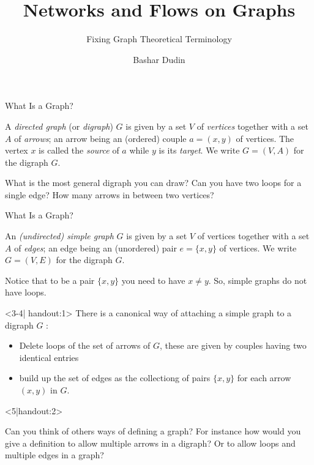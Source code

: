 \documentclass[32pt,aspectratio=169]{beamer}
\author[BD]{Bashar Dudin}
\institute[]{EPITA}
\title{Networks and Flows on Graphs} %
\subtitle{Fixing Graph Theoretical Terminology}
\begin{document}
\begin{frame}[plain]
\titlepage %
\end{frame}

\begin{frame}{What Is a Graph?}
  \begin{defn}
    A \emph{directed graph} (or \emph{digraph}) $G$ is given by a set $V$ of
    \emph{vertices} together with a set $A$ of \emph{arrows}; an arrow being an
    (ordered) couple $a = (x,y)$ of vertices. The vertex $x$ is called
    the \emph{source} of $a$ while $y$ is its \emph{target}. We write $G = (V, A)$
    for the digraph $G$.
  \end{defn}
  \pause
  \begin{question}
    What is the most general digraph you can draw? Can you have two
    loops for a single edge? How many arrows in between two vertices?
  \end{question}
\end{frame}

\begin{frame}{What Is a Graph?}
  \begin{defn}
    An \emph{(undirected) simple graph} $G$ is given by a set $V$ of vertices
    together with a set $A$ of \emph{edges}; an edge being an (unordered)
    pair $e = \{x,y\}$ of vertices. We write $G = (V, E)$ for the
    digraph $G$.
  \end{defn}
  \pause
  \begin{rem}
    Notice that to be a \alert{pair} $\{x, y\}$ you need to have
    $x \neq y$. So, simple graphs do not have loops.
  \end{rem}

  \begin{overlayarea}{\textwidth}{.35\textheight}
    \begin{onlyenv}<3-4| handout:1>
      There is a canonical way of attaching a simple graph to a digraph
      $G$ :
      \begin{itemize}
      \item<3-> Delete loops of the set of arrows of $G$, these are given by
        couples having two identical entries
      \item<4-> build up the set of edges as the collectiong of pairs
        $\{x, y\}$ for each arrow $(x, y)$ in $G$.
      \end{itemize}
    \end{onlyenv}
    \begin{onlyenv}<5|handout:2>
      \begin{question}
        Can you think of others ways of defining a graph? For instance how
        would you give a definition to allow multiple arrows in a digraph?
        Or to allow loops and multiple edges in a graph?
      \end{question}
    \end{onlyenv}
  \end{overlayarea}
\end{frame}
\end{document}
